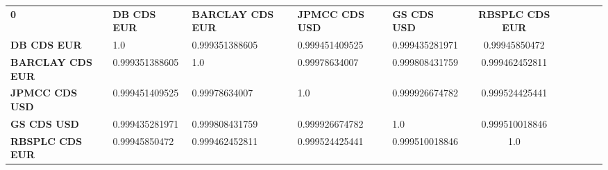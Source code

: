 \begin{center}
 \begin{tabular}{|l|l|l|l|l|c|c|c|c|c|}
\hline
\textbf{0} & \textbf{DB CDS EUR} & \textbf{BARCLAY CDS EUR} & \textbf{JPMCC CDS USD} & \textbf{GS CDS USD} & \textbf{RBSPLC CDS EUR}\\\hhline{|=|=|=|=|=|=|}
\textbf{DB CDS EUR} & 1.0 & 0.999351388605 & 0.999451409525 & 0.999435281971 & 0.99945850472\\
\textbf{BARCLAY CDS EUR} & 0.999351388605 & 1.0 & 0.99978634007 & 0.999808431759 & 0.999462452811\\
\textbf{JPMCC CDS USD} & 0.999451409525 & 0.99978634007 & 1.0 & 0.999926674782 & 0.999524425441\\
\textbf{GS CDS USD} & 0.999435281971 & 0.999808431759 & 0.999926674782 & 1.0 & 0.999510018846\\
\textbf{RBSPLC CDS EUR} & 0.99945850472 & 0.999462452811 & 0.999524425441 & 0.999510018846 & 1.0\\
\hline
\end{tabular}
\end{center}